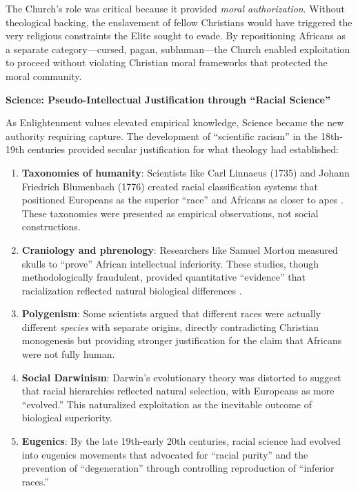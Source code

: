 \documentclass[12pt]{article}
\begin{document}
The Church's role was critical because it provided \textit{moral authorization}. Without theological backing, the enslavement of fellow Christians would have triggered the very religious constraints the Elite sought to evade. By repositioning Africans as a separate category---cursed, pagan, subhuman---the Church enabled exploitation to proceed without violating Christian moral frameworks that protected the moral community.

\textbf{Science: Pseudo-Intellectual Justification through ``Racial Science''}

As Enlightenment values elevated empirical knowledge, Science became the new authority requiring capture. The development of ``scientific racism'' in the 18th-19th centuries provided secular justification for what theology had established:

\begin{enumerate}
    \item \textbf{Taxonomies of humanity}: Scientists like Carl Linnaeus (1735) and Johann Friedrich Blumenbach (1776) created racial classification systems that positioned Europeans as the superior ``race'' and Africans as closer to apes \cite{gould}. These taxonomies were presented as empirical observations, not social constructions.
    
    \item \textbf{Craniology and phrenology}: Researchers like Samuel Morton measured skulls to ``prove'' African intellectual inferiority. These studies, though methodologically fraudulent, provided quantitative ``evidence'' that racialization reflected natural biological differences \cite{gould}.
    
    \item \textbf{Polygenism}: Some scientists argued that different races were actually different \textit{species} with separate origins, directly contradicting Christian mono\-genesis but providing stronger justification for the claim that Africans were not fully human.
    
    \item \textbf{Social Darwinism}: Darwin's evolutionary theory was distorted to suggest that racial hierarchies reflected natural selection, with Europeans as more ``evolved.'' This naturalized exploitation as the inevitable outcome of biological superiority.
    
    \item \textbf{Eugenics}: By the late 19th-early 20th centuries, racial science had evolved into eugenics movements that advocated for ``racial purity'' and the prevention of ``degeneration'' through controlling reproduction of ``inferior races.''
\end{enumerate}
\end{document}
